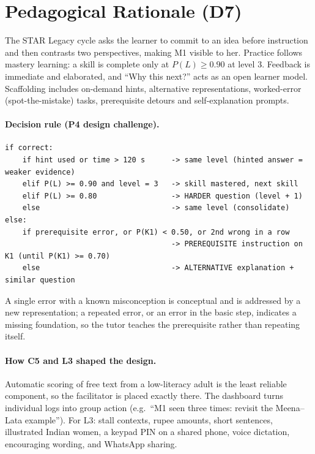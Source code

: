 \documentclass[10pt,a4paper]{article}
\begin{document}
\section{Pedagogical Rationale (D7)}
\label{sec:tutor}
The STAR Legacy cycle asks the learner to commit to an idea before instruction and then contrasts two perspectives, making M1 visible to her. Practice follows mastery learning: a skill is complete only at $P(L)\geq0.90$ at level 3. Feedback is immediate and elaborated, and ``Why this next?'' acts as an open learner model. Scaffolding includes on-demand hints, alternative representations, worked-error (spot-the-mistake) tasks, prerequisite detours and self-explanation prompts.

\paragraph{Decision rule (P4 design challenge).}
\begin{lstlisting}
if correct:
    if hint used or time > 120 s      -> same level (hinted answer = weaker evidence)
    elif P(L) >= 0.90 and level = 3   -> skill mastered, next skill
    elif P(L) >= 0.80                 -> HARDER question (level + 1)
    else                              -> same level (consolidate)
else:
    if prerequisite error, or P(K1) < 0.50, or 2nd wrong in a row
                                      -> PREREQUISITE instruction on K1 (until P(K1) >= 0.70)
    else                              -> ALTERNATIVE explanation + similar question
\end{lstlisting}
A single error with a known misconception is conceptual and is addressed by a new representation; a repeated error, or an error in the basic step, indicates a missing foundation, so the tutor teaches the prerequisite rather than repeating itself.

\paragraph{How C5 and L3 shaped the design.} Automatic scoring of free text from a low-literacy adult is the least reliable component, so the facilitator is placed exactly there. The dashboard turns individual logs into group action (e.g.\ ``M1 seen three times: revisit the Meena--Lata example''). For L3: stall contexts, rupee amounts, short sentences, illustrated Indian women, a keypad PIN on a shared phone, voice dictation, encouraging wording, and WhatsApp sharing.
\end{document}
